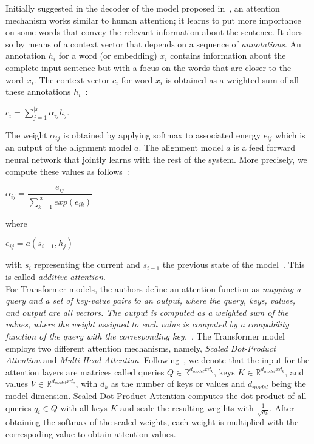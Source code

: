 Initially suggested in the decoder of the model proposed in~\parencite{NeuralMachineTranslationByJointlyLearning_Bahdanau}, an attention mechanism works similar to human attention; it learns to put more importance on some words that convey the relevant information about the sentence. It does so by means of a context vector that depends on a sequence of \emph{annotations}. An annotation $h_i$ for a word (or embedding) $x_i$ contains information about the complete input sentence but with a focus on the words that are closer to the word $x_i$. The context vector $c_i$ for word $x_i$ is obtained as a weighted sum of all these annotations $h_i$~\parencite{NeuralMachineTranslationByJointlyLearning_Bahdanau}:
\begin{center}
    $c_i = \sum\limits_{j=1}^{|x|} \alpha_{ij} h_j$.
\end{center}
The weight $\alpha_{ij}$ is obtained by applying softmax to associated energy $e_{ij}$ which is an output of the alignment model $a$. The alignment model $a$ is a feed forward neural network that jointly learns with the rest of the system. More precisely, we compute these values as follows~\parencite{NeuralMachineTranslationByJointlyLearning_Bahdanau}:
\begin{center}
    $\alpha_{ij} = \dfrac{e_{ij}}{\sum\limits_{k=1}^{|x|} exp(e_{ik})}$
\end{center}
where
\begin{center}
    $e_{ij} = a(s_{i-1}, h_j)$
\end{center}
with $s_i$ representing the current and $s_{i-1}$ the previous state of the
model~\parencite{NeuralMachineTranslationByJointlyLearning_Bahdanau}. This is called \emph{additive attention}.\\
For Transformer models, the authors define an attention function as \emph{mapping a query and a set of key-value pairs to an output, where the query, keys, values, and output are all vectors. The output is computed as a weighted sum of the values, where the weight assigned to each value is computed by a compability function of the query with the corresponding key.}~\parencite{AttentionIsAllYouNeed_Vaswani}. The Transformer model employs two different attention mechanisms, namely, \emph{Scaled Dot-Product Attention} and \emph{Multi-Head Attention}. Following~\parencite{AttentionIsAllYouNeed_Vaswani}, we denote that the input for the attention layers are matrices called queries $Q \in \mathbb{R}^{d_{model}xd_k}$, keys $K \in \mathbb{R}^{d_{model}xd_k}$, and values $V \in \mathbb{R}^{d_{model}xd_v}$, with $d_k$ as the number of keys or values and $d_{model}$ being the model dimension. Scaled Dot-Product Attention computes the dot product of all queries $q_i \in Q$ with all keys $K$ and scale the resulting wegihts with $\frac{1}{\sqrt{d_k}}$. After obtaining the softmax of the scaled weights, each weight is multiplied with the correspoding value to obtain attention values.
